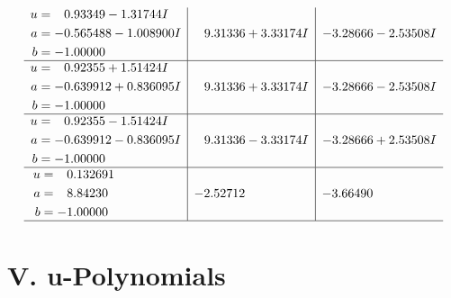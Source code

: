 \documentclass[1p]{elsarticle_modified}
\theoremstyle{definition}
\begin{document}
$$\begin{array}{c|c|c}
\begin{aligned}
u &= \phantom{-}0.93349 - 1.31744 I \\
a &= -0.565488 - 1.008900 I \\
b &= -1.00000\phantom{ +0.000000I}\end{aligned}
 & \phantom{-}9.31336 + 3.33174 I & -3.28666 - 2.53508 I \\ \hline\begin{aligned}
u &= \phantom{-}0.92355 + 1.51424 I \\
a &= -0.639912 + 0.836095 I \\
b &= -1.00000\phantom{ +0.000000I}\end{aligned}
 & \phantom{-}9.31336 + 3.33174 I & -3.28666 - 2.53508 I \\ \hline\begin{aligned}
u &= \phantom{-}0.92355 - 1.51424 I \\
a &= -0.639912 - 0.836095 I \\
b &= -1.00000\phantom{ +0.000000I}\end{aligned}
 & \phantom{-}9.31336 - 3.33174 I & -3.28666 + 2.53508 I \\ \hline\begin{aligned}
u &= \phantom{-}0.132691\phantom{ +0.000000I} \\
a &= \phantom{-}8.84230\phantom{ +0.000000I} \\
b &= -1.00000\phantom{ +0.000000I}\end{aligned}
 & -2.52712\phantom{ +0.000000I} & -3.66490\phantom{ +0.000000I}\\
 \hline 
 \end{array}$$\newpage
\newpage\renewcommand{\arraystretch}{1}
\centering \section*{ V. u-Polynomials}
\end{document}
